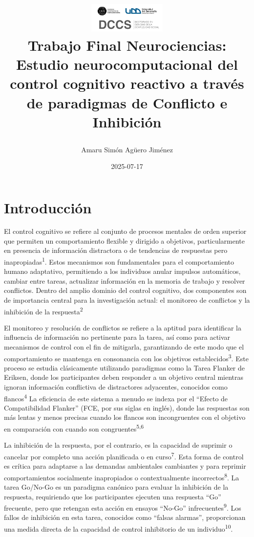 \documentclass[
  spanish,
  10pt,
]{article}
\title{\begin{center}
  \includegraphics[height=1.5cm]{logo2.png} \\[1cm]
  \Large Trabajo Final Neurociencias: \\ Estudio neurocomputacional del control cognitivo reactivo a través de paradigmas de Conflicto e Inhibición
\end{center}}
\author{Amaru Simón Agüero Jiménez}
\date{2025-07-17}
\renewcommand*\contentsname{Tabla de contenidos}
\newcommand\contentsname{Tabla de contenidos}
\begin{document}
\maketitle

\renewcommand*\contentsname{Tabla de contenidos}
{
\hypersetup{linkcolor=}
\setcounter{tocdepth}{3}
\tableofcontents
}

\newpage

\section{Introducción}\label{introducciuxf3n}

El control cognitivo se refiere al conjunto de procesos mentales de
orden superior que permiten un comportamiento flexible y dirigido a
objetivos, particularmente en presencia de información distractora o de
tendencias de respuestas pero inapropiadas\textsuperscript{1}. Estos
mecanismos son fundamentales para el comportamiento humano adaptativo,
permitiendo a los individuos anular impulsos automáticos, cambiar entre
tareas, actualizar información en la memoria de trabajo y resolver
conflictos. Dentro del amplio dominio del control cognitivo, dos
componentes son de importancia central para la investigación actual: el
monitoreo de conflictos y la inhibición de la
respuesta\textsuperscript{2}

El monitoreo y resolución de conflictos se refiere a la aptitud para
identificar la influencia de información no pertinente para la tarea,
así como para activar mecanismos de control con el fin de mitigarla,
garantizando de este modo que el comportamiento se mantenga en
consonancia con los objetivos establecidos\textsuperscript{3}. Este
proceso se estudia clásicamente utilizando paradigmas como la Tarea
Flanker de Eriksen, donde los participantes deben responder a un
objetivo central mientras ignoran información conflictiva de
distractores adyacentes, conocidos como flancos\textsuperscript{4} La
eficiencia de este sistema a menudo se indexa por el ``Efecto de
Compatibilidad Flanker'' (FCE, por sus siglas en inglés), donde las
respuestas son más lentas y menos precisas cuando los flancos son
incongruentes con el objetivo en comparación con cuando son
congruentes\textsuperscript{5,6}

La inhibición de la respuesta, por el contrario, es la capacidad de
suprimir o cancelar por completo una acción planificada o en
curso\textsuperscript{7}. Esta forma de control es crítica para
adaptarse a las demandas ambientales cambiantes y para reprimir
comportamientos socialmente inapropiados o contextualmente
incorrectos\textsuperscript{8}. La tarea Go/No-Go es un paradigma
canónico para evaluar la inhibición de la respuesta, requiriendo que los
participantes ejecuten una respuesta ``Go'' frecuente, pero que retengan
esta acción en ensayos ``No-Go'' infrecuentes\textsuperscript{9}. Los
fallos de inhibición en esta tarea, conocidos como ``falsas alarmas'',
proporcionan una medida directa de la capacidad de control inhibitorio
de un individuo\textsuperscript{10}.
\end{document}
